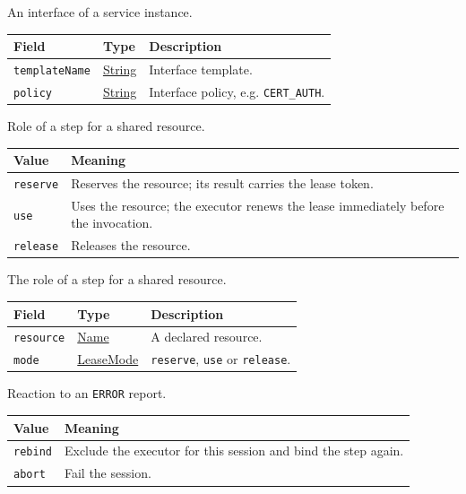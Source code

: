\documentclass[a4paper]{arrowhead}
\newcommand{\mref}[1]{{\textcolor{ArrowheadPurple}{\hyperref[sec:model:#1]{#1}}}}
\newcommand{\pref}[1]{{\textcolor{ArrowheadGrey}{\hyperref[sec:model:primitives:#1]{#1}}}}
\begin{document}
An interface of a service instance.

{\small
\begin{longtable}{|p{3.9cm}|p{4.4cm}|p{7.5cm}|}

\hline
\rowcolor{gray!33} Field & Type & Description \\ \hline
\endhead
\texttt{templateName} & \pref{String} & Interface template. \\ \hline
\texttt{policy} & \pref{String} & Interface policy, e.g. \texttt{CERT\_AUTH}. \\ \hline
\end{longtable}
}

Role of a step for a shared resource.

{\small
\begin{longtable}{|p{3.9cm}|p{11.9cm}|}

\hline
\rowcolor{gray!33} Value & Meaning \\ \hline
\endhead
\texttt{reserve} & Reserves the resource; its result carries the lease token. \\ \hline
\texttt{use} & Uses the resource; the executor renews the lease immediately before the invocation. \\ \hline
\texttt{release} & Releases the resource. \\ \hline
\end{longtable}
}

The role of a step for a shared resource.

{\small
\begin{longtable}{|p{3.9cm}|p{4.4cm}|p{7.5cm}|}

\hline
\rowcolor{gray!33} Field & Type & Description \\ \hline
\endhead
\texttt{resource} & \pref{Name} & A declared resource. \\ \hline
\texttt{mode} & \mref{LeaseMode} & \texttt{reserve}, \texttt{use} or \texttt{release}. \\ \hline
\end{longtable}
}

Reaction to an \texttt{ERROR} report.

{\small
\begin{longtable}{|p{3.9cm}|p{11.9cm}|}

\hline
\rowcolor{gray!33} Value & Meaning \\ \hline
\endhead
\texttt{rebind} & Exclude the executor for this session and bind the step again. \\ \hline
\texttt{abort} & Fail the session. \\ \hline
\end{longtable}
}
\end{document}
